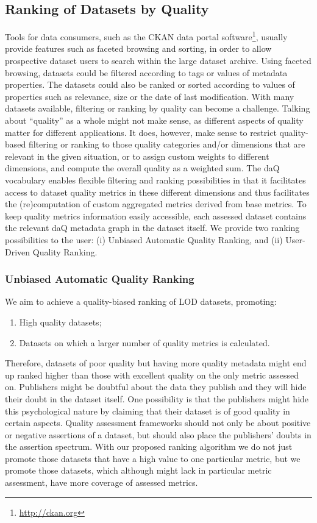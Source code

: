 
\subsection{Ranking of Datasets by Quality}
\label{sec:Ranking} 
Tools for data consumers, such as the CKAN data portal software\footnote{\url{http://ckan.org}}, usually provide features such as faceted browsing and sorting, in order to allow prospective dataset users to search within the large dataset archive.
Using faceted browsing, datasets could be filtered according to tags or values of metadata properties.
The datasets could also be ranked or sorted according to values of properties such as relevance, size or the date of last modification.
With many datasets available, filtering or ranking by quality can become a challenge.
Talking about ``quality'' as a whole might not make sense, as different aspects of quality matter for different applications.
It does, however, make sense to restrict quality-based filtering or ranking to those quality categories and/or dimensions that are relevant in the given situation, or to assign custom weights to different dimensions, and compute the overall quality as a weighted sum.
The daQ vocabulary enables flexible filtering and ranking possibilities in that it facilitates access to dataset quality metrics in these different dimensions and thus facilitates the (re)computation of custom aggregated metrics derived from base metrics.
To keep quality metrics information easily accessible, each assessed dataset contains the relevant daQ metadata graph in the dataset itself.
We provide two ranking possibilities to the user: (i) Unbiased Automatic Quality Ranking, and (ii) User-Driven Quality Ranking.

\subsubsection{Unbiased Automatic Quality Ranking}
We aim to achieve a quality-biased ranking of LOD datasets, promoting:
\begin{enumerate}
\item High quality datasets;
\item Datasets on which a larger number of quality metrics is calculated. 
\end{enumerate}
Therefore, datasets of poor quality but having more quality metadata might end up ranked higher than those with excellent quality on the only metric assessed on.
Publishers might be doubtful about the data they publish and they will hide their doubt in the dataset itself.
One possibility is that the publishers might hide this psychological nature by claiming that their dataset is of good quality in certain aspects.
Quality assessment frameworks should not only be about positive or negative assertions of a dataset, but should also place the publishers' doubts in the assertion spectrum.
With our proposed ranking algorithm we do not just promote those datasets that have a high value to one particular metric, but we promote those datasets, which although might lack in particular metric assessment, have more coverage of assessed metrics.

